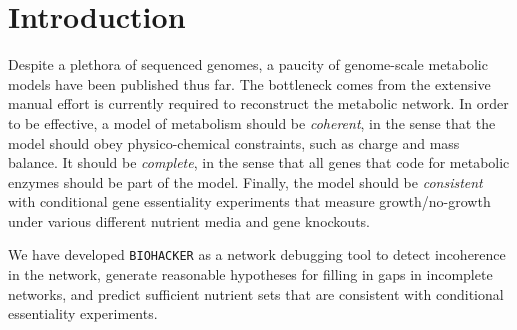 \section{Introduction}
Despite a plethora of sequenced genomes, a paucity of genome-scale
metabolic models have been published thus far.  The bottleneck comes
from the extensive manual effort is currently required to reconstruct
the metabolic network.  In order to be effective, a model of
metabolism should be {\em coherent}, in the sense that the model
should obey physico-chemical constraints, such as charge and mass
balance.  It should be {\em complete}, in the sense that all genes
that code for metabolic enzymes should be part of the model.
Finally, the model should be {\em consistent} with conditional gene
essentiality experiments that measure growth/no-growth under various
different nutrient media and gene knockouts.

We have developed {\tt BIOHACKER} as a network debugging tool to
detect incoherence in the network, generate reasonable hypotheses for
filling in gaps in incomplete networks, and predict sufficient nutrient
sets that are consistent with conditional essentiality experiments.


